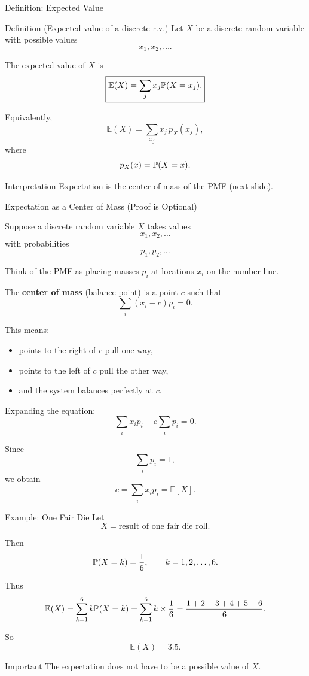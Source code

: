 \begin{frame}{Definition: Expected Value}
\begin{keybox}{Definition (Expected value of a discrete r.v.)}
Let $X$ be a discrete random variable with possible values
\[
x_1,x_2,\dots.
\]

The expected value of $X$ is
\[
\boxed{
\mathbb{E}(X)=\sum_j x_j\mathbb{P}(X=x_j).
}
\]
\end{keybox}

Equivalently,
\[
\mathbb{E}(X)=\sum_{x_j} x_j\,p_X(x_j),
\]
where
\[
p_X(x)=\mathbb{P}(X=x).
\]

\begin{keybox}{Interpretation}
Expectation is the center of mass of the PMF (next slide).
\end{keybox}
\end{frame}


\begin{frame}{Expectation as a Center of Mass (Proof is Optional)}

Suppose a discrete random variable \(X\) takes values
\[
x_1,x_2,\dots
\]
with probabilities
\[
p_1,p_2,\dots
\]

Think of the PMF as placing masses \(p_i\) at locations \(x_i\) on the number line.

The \textbf{center of mass} (balance point) is a point \(c\) such that
\[
\sum_i (x_i-c)p_i = 0.
\]

This means:
\begin{itemize}
    \item points to the right of \(c\) pull one way,
    \item points to the left of \(c\) pull the other way,
    \item and the system balances perfectly at \(c\).
\end{itemize}
Expanding the equation:
\[
\sum_i x_i p_i - c\sum_i p_i = 0.
\]

Since
\[
\sum_i p_i = 1,
\]
we obtain
\[
c = \sum_i x_i p_i = \mathbb{E}[X].
\]

\end{frame}











\begin{frame}{Example: One Fair Die}
Let
\[
X=\text{result of one fair die roll}.
\]

Then
\[
\mathbb{P}(X=k)=\frac16,
\qquad k=1,2,\dots,6.
\]

Thus
\[
\mathbb{E}(X)
=
\sum_{k=1}^6 k\mathbb{P}(X=k)
=\sum_{k=1}^6 k\times \frac{1}{6}= 
\frac{1+2+3+4+5+6}{6}.
\]

So
\[
{\mathbb{E}(X)=3.5.}
\]

\begin{keybox}{Important}
The expectation does not have to be a possible value of $X$.
\end{keybox}
\end{frame}

